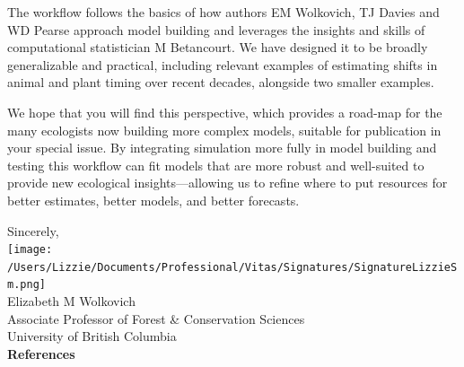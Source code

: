 \documentclass[11pt]{article}
\begin{document}
The workflow follows the basics of how authors EM Wolkovich, TJ Davies and WD Pearse approach model building and leverages the insights and skills of computational statistician M Betancourt. We have designed it to be broadly generalizable and practical, including relevant examples of estimating shifts in animal and plant timing over recent decades, alongside two smaller examples. %

We hope that you will find this perspective, which provides a road-map for the many ecologists now building more complex models, suitable for publication in your special issue. By integrating simulation more fully in model building and testing this workflow can fit models that are more robust and well-suited to provide new ecological insights---allowing us to refine where to put resources for better estimates, better models, and better forecasts. %

Sincerely,\\

\texttt{[image: /Users/Lizzie/Documents/Professional/Vitas/Signatures/SignatureLizzieSm.png]} \\

Elizabeth M Wolkovich\\
Associate Professor of Forest \& Conservation Sciences\\ 
University of British Columbia\\

{\bf References}
\vspace{-8ex}

\end{document}
